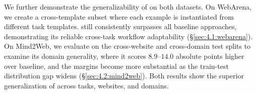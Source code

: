 We further demonstrate the generalizability of \awm on both datasets.
On WebArena, we create a cross-template subset where each example is instantiated from different task templates. \awm still consistently surpasses all baseline approaches, demonstrating its reliable cross-task workflow adaptability (\S\ref{sec:4.1:webarena}).
On Mind2Web, we evaluate \awm on the cross-website and cross-domain test splits to examine its domain generality, where it scores $8.9$--$14.0$ absolute points higher over baseline, and the margins become more substantial as the train-test distribution gap widens (\S\ref{sec:4.2:mind2web}). Both results show the superior generalization of \awm across tasks, websites, and domains.

